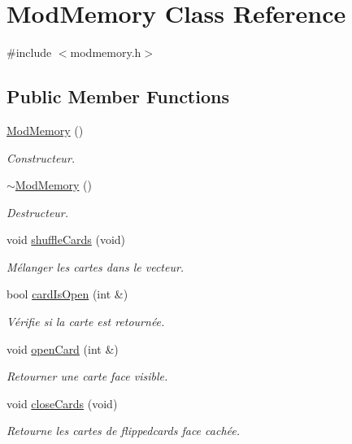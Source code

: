 \hypertarget{class_mod_memory}{}\section{Mod\+Memory Class Reference}
\label{class_mod_memory}


{\ttfamily \#include $<$modmemory.\+h$>$}

\subsection*{Public Member Functions}
\begin{DoxyCompactItemize}
\item 
\hyperlink{class_mod_memory_a8604678a120d5f8e430d5d2248a44e36}{Mod\+Memory} ()
\begin{DoxyCompactList}\small\item\em Constructeur. \end{DoxyCompactList}\item 
\hyperlink{class_mod_memory_a77d39288e861c84edcfa760170fbc44d}{$\sim$\+Mod\+Memory} ()
\begin{DoxyCompactList}\small\item\em Destructeur. \end{DoxyCompactList}\item 
void \hyperlink{class_mod_memory_ad85f5a28220e641195215e705a928fb1}{shuffle\+Cards} (void)
\begin{DoxyCompactList}\small\item\em Mélanger les cartes dans le vecteur. \end{DoxyCompactList}\item 
bool \hyperlink{class_mod_memory_a67247c021d8bf91192c2c32c1eb560ad}{card\+Is\+Open} (int \&)
\begin{DoxyCompactList}\small\item\em Vérifie si la carte est retournée. \end{DoxyCompactList}\item 
void \hyperlink{class_mod_memory_a5886105416521e463eeaf732e8a0f6fe}{open\+Card} (int \&)
\begin{DoxyCompactList}\small\item\em Retourner une carte face visible. \end{DoxyCompactList}\item 
void \hyperlink{class_mod_memory_a4e6581fef7b3adbad429bf4c39d38e88}{close\+Cards} (void)
\begin{DoxyCompactList}\small\item\em Retourne les cartes de flippedcards face cachée. \end{DoxyCompactList}\item 

\end{DoxyCompactItemize}
